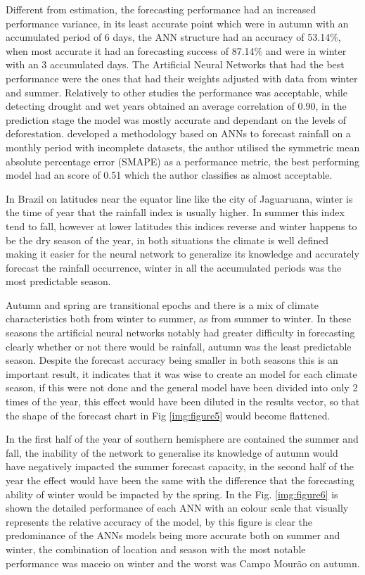 Different from estimation, the forecasting performance had an increased performance variance, in its least accurate point which were in autumn with an accumulated period of 6 days, the ANN structure had an accuracy of 53.14\%, when most accurate it had an forecasting success of 87.14\% and were in winter with an 3 accumulated days. The Artificial Neural Networks that had the best performance were the ones that had their weights adjusted with data from winter and summer.  Relatively to other studies the performance was acceptable, \citeauthor{valipour2016optimization}  \citeyear{valipour2016optimization} while detecting drought and wet years obtained an average correlation of 0.90, in the prediction stage the model was mostly accurate and dependant on the levels of deforestation. \citeauthor{rivero2015short} \citeyear{rivero2015short} developed a methodology based on ANNs to forecast rainfall on a monthly period with incomplete datasets, the author utilised the symmetric mean absolute percentage error (SMAPE) as a performance metric, the best performing model had an score of 0.51 which the author classifies as almost acceptable.

In Brazil on latitudes near the equator line like the city of Jaguaruana, winter is the time of year that the rainfall index is usually higher. In summer this index tend to fall, however at lower latitudes this indices reverse and winter happens to be the dry season of the year, in both situations the climate is well defined making it easier for the neural network to generalize its knowledge and accurately forecast the rainfall occurrence, winter in all the accumulated periods was the most predictable season.
  
Autumn and spring are transitional epochs and there is a mix of climate characteristics both from winter to summer, as from summer to winter. In these seasons the artificial neural networks notably had greater difficulty in forecasting clearly whether or not there would be rainfall, autumn was the least predictable season. 
Despite the forecast accuracy being smaller in both seasons this is an important result, it indicates that it was wise to create an model for each climate season, if this were not done and the general model have been divided into only 2 times of the year, this effect would have been diluted in the results vector, so that the shape of the forecast chart in Fig \ref{img:figure5} would become flattened. 

In the first half of the year of southern hemisphere are contained the summer and fall, the inability of the network to generalise its knowledge of autumn would have negatively impacted the summer forecast capacity, in the second half of the year the effect would have been the same with the difference that the forecasting ability of winter would be impacted by the spring. In the Fig. \ref{img:figure6} is shown the detailed performance of each ANN with an colour scale that visually represents the relative accuracy of the model, by this figure is clear the predominance of the ANNs models being more accurate both on summer and winter, the combination of location and season with the most notable performance was maceio on winter and the worst was Campo Mourão on autumn.  

